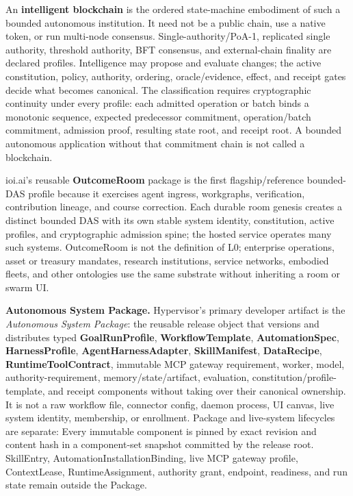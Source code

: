 \documentclass[
  11pt,
]{article}
\begin{document}
An \textbf{intelligent blockchain} is the ordered state-machine embodiment of
such a bounded autonomous institution. It need not be a public chain, use a
native token, or run multi-node consensus. Single-authority/PoA-1, replicated
single authority, threshold authority, BFT consensus, and external-chain
finality are declared profiles. Intelligence may propose and evaluate changes;
the active constitution, policy, authority, ordering, oracle/evidence, effect,
and receipt gates decide what becomes canonical. The classification requires
cryptographic continuity under every profile: each admitted operation or batch
binds a monotonic sequence, expected predecessor commitment, operation/batch
commitment, admission proof, resulting state root, and receipt root. A bounded
autonomous application without that commitment chain is not called a
blockchain.

ioi.ai's reusable \textbf{OutcomeRoom} package is the first flagship/reference
bounded-DAS profile because it exercises agent ingress, workgraphs,
verification, contribution lineage, and course correction. Each durable room
genesis creates a distinct bounded DAS with its own stable system identity,
constitution, active profiles, and cryptographic admission spine; the hosted
service operates many such systems. OutcomeRoom is not the definition of L0;
enterprise operations, asset or treasury mandates, research institutions,
service networks, embodied fleets, and other ontologies use the same substrate
without inheriting a room or swarm UI.

\textbf{Autonomous System Package.} Hypervisor's primary developer
artifact is the \emph{Autonomous System Package}: the reusable release object
that versions and distributes typed \textbf{GoalRunProfile},
\textbf{WorkflowTemplate}, \textbf{AutomationSpec}, \textbf{HarnessProfile},
\textbf{AgentHarnessAdapter}, \textbf{SkillManifest}, \textbf{DataRecipe},
\textbf{RuntimeToolContract}, immutable MCP gateway
requirement, worker, model, authority-requirement,
memory/state/artifact, evaluation, constitution/profile-template, and receipt
components without taking over their canonical ownership. It is not a raw
workflow file, connector config, daemon process, UI canvas, live system identity,
membership, or enrollment. Package and live-system lifecycles are separate:
Every immutable component is pinned by exact revision and content hash in a
component-set snapshot committed by the release root. SkillEntry,
AutomationInstallationBinding, live MCP gateway profile, ContextLease,
RuntimeAssignment, authority grant, endpoint, readiness, and run state remain
outside the Package.
\end{document}

